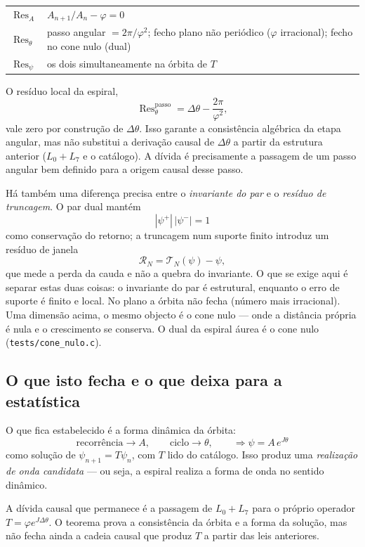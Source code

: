\documentclass[11pt,a4paper]{article}
\begin{document}
\begin{center}
\renewcommand{\arraystretch}{1.2}
\begin{tabular}{@{}ll@{}}
$\operatorname{Res}_A$ & $A_{n+1}/A_n-\varphi=0$ \\
$\operatorname{Res}_\theta$ & passo angular $=2\pi/\varphi^2$; fecho plano não periódico
($\varphi$ irracional); fecho no cone nulo (dual) \\
$\operatorname{Res}_\psi$ & os dois simultaneamente na órbita de $T$ \\
\end{tabular}
\end{center}

O resíduo local da espiral,
\[
\operatorname{Res}^{\mathrm{passo}}_\theta
=\Delta\theta-\frac{2\pi}{\varphi^2},
\]
vale zero por construção de $\Delta\theta$. Isso garante a consistência algébrica da etapa angular,
mas não substitui a derivação causal de $\Delta\theta$ a partir da estrutura anterior
($L_0+L_7$ e o catálogo). A dívida é precisamente a passagem de um passo angular bem definido
para a origem causal desse passo.

Há também uma diferença precisa entre o \emph{invariante do par} e o \emph{resíduo de truncagem}.
O par dual mantém
\[
|\psi^+|\,|\psi^-|=1
\]
como conservação do retorno; a truncagem num suporte finito introduz um resíduo de janela
\[
\mathcal R_N=\mathcal T_N(\psi)-\psi,
\]
que mede a perda da cauda e não a quebra do invariante. O que se exige aqui é separar estas duas
coisas: o invariante do par é estrutural, enquanto o erro de suporte é finito e local.
No plano a órbita não fecha (número mais irracional). Uma dimensão acima, o mesmo objecto
é o cone nulo --- onde a distância própria é nula e o crescimento se conserva. O dual da
espiral áurea é o cone nulo (\texttt{tests/cone\_nulo.c}).

\subsection{O que isto fecha e o que deixa para a estatística}

O que fica estabelecido é a forma dinâmica da órbita:
\[
\text{recorrência}\longrightarrow A,\qquad
\text{ciclo}\longrightarrow\theta,\qquad
\Longrightarrow\psi=A\,e^{J\theta}
\]
como solução de $\psi_{n+1}=T\psi_n$, com $T$ lido do catálogo. Isso produz uma
\emph{realização de onda candidata} --- ou seja, a espiral realiza a forma de onda no
sentido dinâmico.

A dívida causal que permanece é a passagem de $L_0+L_7$ para o próprio operador
$T=\varphi e^{J\Delta\theta}$. O teorema prova a consistência da órbita e a forma da solução,
mas não fecha ainda a cadeia causal que produz $T$ a partir das leis anteriores.
\end{document}
